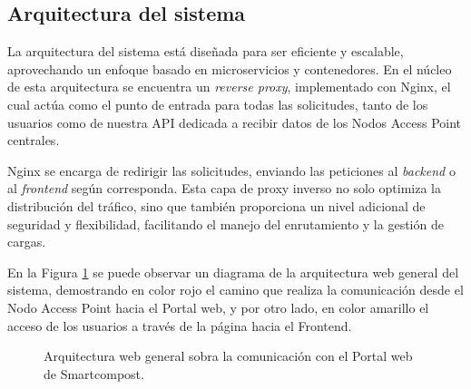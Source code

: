 \subsection{Arquitectura del sistema}

La arquitectura del sistema está diseñada para ser eficiente y escalable, aprovechando un enfoque basado en microservicios y contenedores. En el núcleo de esta arquitectura se encuentra un \textit{ reverse proxy}, implementado con Nginx, el cual actúa como el punto de entrada para todas las solicitudes, tanto de los usuarios como de nuestra API dedicada a recibir datos de los Nodos Access Point centrales.

Nginx se encarga de redirigir las solicitudes, enviando las peticiones al \textit{backend} o al \textit{frontend} según corresponda. Esta capa de proxy inverso no solo optimiza la distribución del tráfico, sino que también proporciona un nivel adicional de seguridad y flexibilidad, facilitando el manejo del enrutamiento y la gestión de cargas.

En la Figura \ref{fig:arquitecturaweb} se puede observar un diagrama de la arquitectura web general del sistema, demostrando en color rojo el camino que realiza la comunicación desde el Nodo Access Point hacia el Portal web, y por otro lado, en color amarillo el acceso de los usuarios a través de la página hacia el Frontend.

\begin{figure}[H]
    \caption{Arquitectura web general sobra la comunicación con el Portal web de Smartcompost.}
    \label{fig:arquitecturaweb}
\end{figure}

